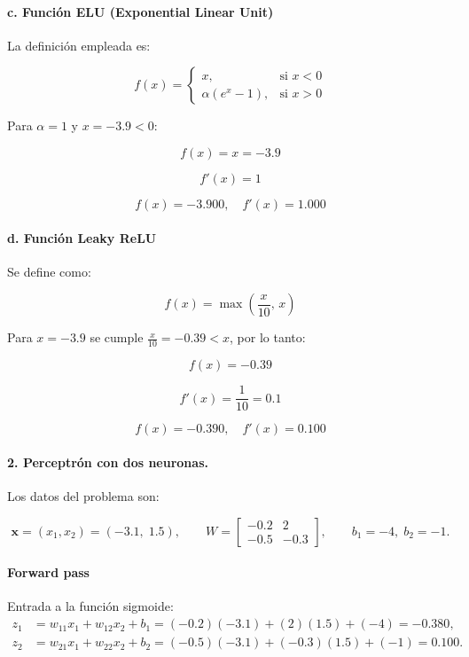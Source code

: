 \documentclass[a4paper,12pt]{article}
\begin{document}
\paragraph{c. Función ELU (Exponential Linear Unit)}

La definición empleada es:

\[
f(x) =
\begin{cases}
x, & \text{si } x < 0 \\
\alpha (e^{x} - 1), & \text{si } x > 0
\end{cases}
\]

Para $\alpha = 1$ y $x = -3.9 < 0$:

\[
f(x) = x = -3.9
\]

\[
f'(x) = 1
\]

\[
\boxed{f(x) = -3.900, \quad f'(x) = 1.000}
\]

\paragraph{d. Función Leaky ReLU}

Se define como:

\[
f(x) = \max\left(\frac{x}{10},\, x\right)
\]

Para $x = -3.9$ se cumple $\frac{x}{10} = -0.39 < x$, por lo tanto:

\[
f(x) = -0.39
\]

\[
f'(x) = \frac{1}{10} = 0.1
\]

\[
\boxed{f(x) = -0.390, \quad f'(x) = 0.100}
\]


\vspace{0.5em}


\paragraph{2. Perceptrón con dos neuronas.} Los datos del problema son:

\[
\mathbf{x} = (x_1,x_2)=(-3.1,\;1.5), \qquad
W=\begin{bmatrix}-0.2 & 2 \\[4pt] -0.5 & -0.3\end{bmatrix}, \qquad
b_1=-4,\; b_2=-1.
\]

\paragraph{Forward pass}

Entrada a la función sigmoide:
\[
\begin{aligned}
z_1 &= w_{11}x_1 + w_{12}x_2 + b_1 = (-0.2)(-3.1) + (2)(1.5) + (-4) = -0.380,\\[4pt]
z_2 &= w_{21}x_1 + w_{22}x_2 + b_2 = (-0.5)(-3.1) + (-0.3)(1.5) + (-1) = 0.100.
\end{aligned}
\]
\end{document}

